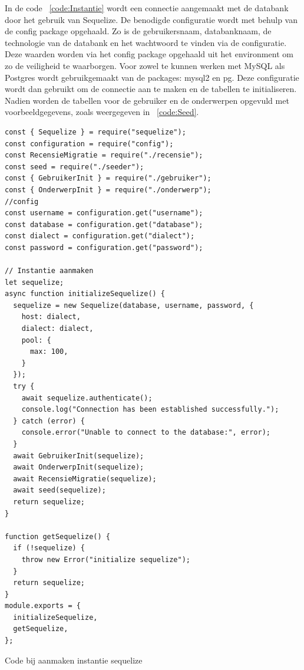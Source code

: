 In de code ~\ref{code:Instantie} wordt een connectie aangemaakt met de databank door het gebruik van Sequelize. 
De benodigde configuratie wordt met behulp van de config package opgehaald. Zo is de 
gebruikersnaam, databanknaam, de technologie van de databank en het wachtwoord te vinden via de configuratie.
Deze waarden worden via het config package opgehaald uit het environment om zo de veiligheid te waarborgen.
Voor zowel te kunnen werken met MySQL als Postgres wordt gebruikgemaakt van de packages: mysql2 en pg.
Deze configuratie wordt dan gebruikt om de connectie aan te maken en de tabellen te initialiseren.
Nadien worden de tabellen voor de gebruiker en de onderwerpen opgevuld met voorbeeldgegevens, zoals weergegeven in ~\ref{code:Seed}.

\begin{listing}[H]
  \centering
  \begin{verbatim}
const { Sequelize } = require("sequelize");
const configuration = require("config");
const RecensieMigratie = require("./recensie");
const seed = require("./seeder");
const { GebruikerInit } = require("./gebruiker");
const { OnderwerpInit } = require("./onderwerp");
//config
const username = configuration.get("username");
const database = configuration.get("database");
const dialect = configuration.get("dialect");
const password = configuration.get("password");

// Instantie aanmaken
let sequelize;
async function initializeSequelize() {
  sequelize = new Sequelize(database, username, password, {
    host: dialect,
    dialect: dialect,
    pool: {
      max: 100,
    }
  });
  try {
    await sequelize.authenticate();
    console.log("Connection has been established successfully.");
  } catch (error) {
    console.error("Unable to connect to the database:", error);
  }
  await GebruikerInit(sequelize);
  await OnderwerpInit(sequelize);
  await RecensieMigratie(sequelize);
  await seed(sequelize);
  return sequelize;
}

function getSequelize() {
  if (!sequelize) {
    throw new Error("initialize sequelize");
  }
  return sequelize;
}
module.exports = {
  initializeSequelize,
  getSequelize,
};
\end{verbatim}
\caption[Sequelize instantie]{\label{code:Instantie}Code bij aanmaken instantie sequelize}
\end{listing}

